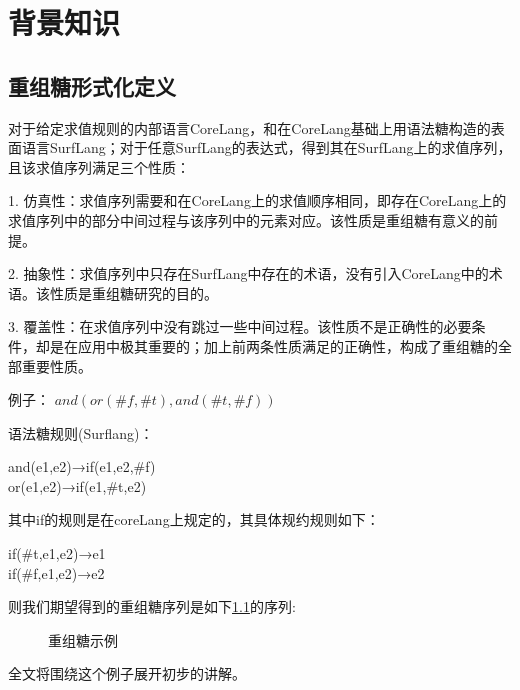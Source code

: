 \pagestyle{fancy}
\normalsize
\linespread{1.5}\selectfont
\label{mark:chapter2}\chapter{背景知识}

\section{重组糖形式化定义}
\label{mark:resugaring}对于给定求值规则的内部语言CoreLang，和在CoreLang基础上用语法糖构造的表面语言SurfLang；对于任意SurfLang的表达式，得到其在SurfLang上的求值序列，且该求值序列满足三个性质\label{mark:three}：

1.	仿真性：求值序列需要和在CoreLang上的求值顺序相同，即存在CoreLang上的求值序列中的部分中间过程与该序列中的元素对应。该性质是重组糖有意义的前提。

2.	抽象性：求值序列中只存在SurfLang中存在的术语，没有引入CoreLang中的术语。该性质是重组糖研究的目的。

3.	覆盖性：在求值序列中没有跳过一些中间过程。该性质不是正确性的必要条件，却是在应用中极其重要的；加上前两条性质满足的正确性，构成了重组糖的全部重要性质。

例子：
$and(or(\#f,\#t),and(\#t,\#f))$

语法糖规则(Surflang)：
\begin{center}
	\parbox[t]{\textwidth}{%
		\begin{center}  
			and(e1,e2)→if(e1,e2,\#f)\\
			or(e1,e2)→if(e1,\#t,e2)
		\end{center}  
	}%
\end{center}



其中if的规则是在coreLang上规定的，其具体规约规则如下：
\begin{center}
	\parbox[t]{\textwidth}{%
		\begin{center}  
			if(\#t,e1,e2)→e1\\
			if(\#f,e1,e2)→e2
		\end{center}  
	}%
\end{center}
 

则我们期望得到的重组糖序列是如下\ref{fig:example}的序列:

\begin{figure}[h]
	
\caption{重组糖示例}
\label{fig:example}
\end{figure}
全文将围绕这个例子展开初步的讲解。

